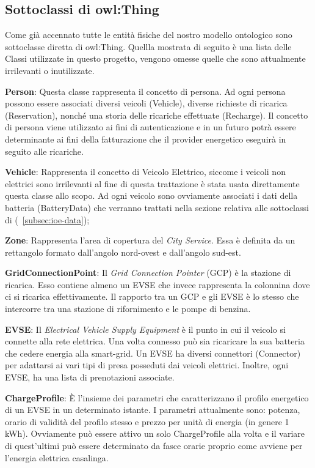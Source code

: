 \subsection{Sottoclassi di owl:Thing}\label{subsec:thing}

Come già accennato tutte le entità fisiche del nostro modello ontologico sono sottoclasse diretta di owl:Thing. Quellla mostrata di seguito è una lista delle Classi utilizzate in questo progetto, vengono omesse quelle che sono attualmente irrilevanti o inutilizzate.

\begin{description}
	\item \textbf{Person}: Questa classe rappresenta il concetto di persona. Ad ogni persona possono essere associati diversi veicoli (Vehicle), diverse richieste di ricarica (Reservation), nonché una storia delle ricariche effettuate (Recharge). Il concetto di persona viene utilizzato ai fini di autenticazione e in un futuro potrà essere determinante ai fini della fatturazione che il provider energetico eseguirà in seguito alle ricariche.
	\item \textbf{Vehicle}: Rappresenta il concetto di Veicolo Elettrico, siccome i veicoli non elettrici sono irrilevanti al fine di questa trattazione è stata usata direttamente questa classe allo scopo. Ad ogni veicolo sono ovviamente associati i dati della batteria (BatteryData) che verranno trattati nella sezione relativa alle sottoclassi di  (~\ref{subsec:ioe-data});
	\item \textbf{Zone}: Rappresenta l'area di copertura del \emph{City Service}. Essa è definita da un rettangolo formato dall'angolo nord-ovest e dall'angolo sud-est. 
	\item \textbf{GridConnectionPoint}: Il \emph{Grid Connection Pointer} (GCP) è la stazione di ricarica. Esso contiene almeno un EVSE che invece rappresenta la colonnina dove ci si ricarica effettivamente. Il rapporto tra un GCP e gli EVSE è lo stesso che intercorre tra una stazione di rifornimento e le pompe di benzina. 
	\item \textbf{EVSE}: Il \emph{Electrical Vehicle Supply Equipment} è il punto in cui il veicolo si connette alla rete elettrica. Una volta connesso può sia ricaricare la sua batteria che cedere energia alla smart-grid. Un EVSE ha diversi connettori (Connector) per adattarsi ai vari tipi di presa posseduti dai veicoli elettrici. Inoltre, ogni EVSE, ha una lista di prenotazioni associate.
	\item \textbf{ChargeProfile}: È l'insieme dei parametri che caratterizzano il profilo energetico di un EVSE in un determinato istante. I parametri attualmente sono: potenza, orario di validità del profilo stesso e prezzo per unità di energia (in genere 1 kWh). Ovviamente può essere attivo un solo ChargeProfile alla volta e il variare di quest'ultimi può essere determinato da fasce orarie proprio come avviene per l'energia elettrica casalinga.

\end{description}
